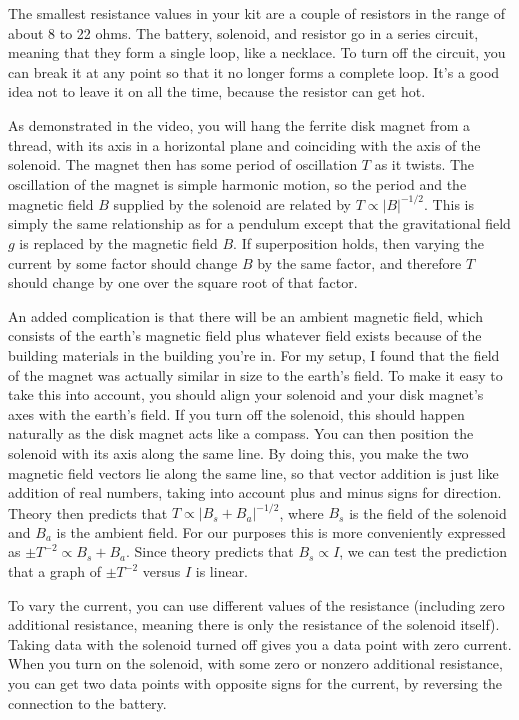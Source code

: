 The smallest resistance
values in your kit are  a couple of resistors in the range of about 8 to 22 ohms.
The battery, solenoid, and resistor go in a series circuit, meaning that they form a single loop, like a necklace.
To turn off the circuit, you can break it at any point so that it no longer forms a complete loop. It's a good idea
not to leave it on all the time, because the resistor can get hot.

As demonstrated in the video, you will hang the ferrite disk magnet from a thread, with its axis in a horizontal plane
and coinciding with the axis of the solenoid. The magnet then has some period of oscillation $T$ as it twists.
The oscillation of the magnet is simple harmonic motion, so the period and
the magnetic field $B$ supplied by the solenoid are related by $T\propto |B|^{-1/2}$.
This is simply the same relationship as for a pendulum except that the gravitational field $g$ is replaced by the magnetic field $B$.
If superposition holds, then varying the current by some factor should change $B$ by the same factor, and therefore
$T$ should change by one over the square root of that factor.

An added complication is that there will be an ambient magnetic field, which consists of the earth's magnetic field
plus whatever field exists because of the building materials in the building you're in. For my setup, I found that
the field of the magnet was actually similar in size to the earth's field. To make it easy to take this into account,
you should align your solenoid and your disk magnet's axes with the earth's field. If you turn off the solenoid, this should
happen naturally as the disk magnet acts like a compass. You can then position the solenoid with its axis along the same line.
By doing this, you make the two magnetic field vectors lie along the same line, so that vector addition is just like addition of
real numbers, taking into account plus and minus signs for direction.
Theory then predicts that $T\propto |B_s+B_a|^{-1/2}$, where $B_s$ is the field of the solenoid and
$B_a$ is the ambient field. For our purposes this is more conveniently expressed as
$\pm T^{-2} \propto B_s+B_a$. Since theory predicts that $B_s\propto I$, we can test the prediction that
a graph of $\pm T^{-2}$ versus $I$ is linear.

\observations

To vary the current, you can use different values of the resistance (including zero additional resistance, meaning
there is only the resistance of the solenoid itself). Taking data with the solenoid turned off gives you a data
point with zero current. When you turn on the solenoid, with some zero or nonzero additional resistance,
you can get two data points with opposite signs for the current, by reversing the connection to the battery.


